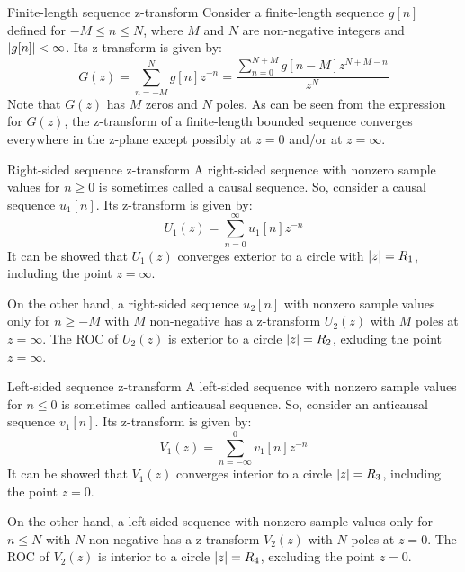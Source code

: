 \documentclass[../../main/main.tex]{subfiles}
\begin{document}
\begin{example}{Finite-length sequence z-transform}{}
    Consider a finite-length sequence \( g[n] \) defined for \( -M \le n \le N \), where \( M \) and \( N \) are non-negative integers and \( \abs{g[n]} < \infty \). Its z-transform is given by:
    \begin{equation}
        G(z)
        =
        \sum_{n=-M}^{N} g[n] z^{-n}
        =
        \frac{\displaystyle \sum_{n=0}^{N+M} g[n-M]z^{N+M-n}}{z^{N}}
        \label{eq:L14_S31_1}
    \end{equation}
    Note that \( G(z) \) has \( M \) zeros and \( N \) poles. As can be seen from the expression for \( G(z) \), the z-transform of a finite-length bounded sequence converges everywhere in the z-plane except possibly at \( z = 0 \) and/or at \( z = \infty \).
\end{example}

\begin{example}{Right-sided sequence z-transform}{}
    A right-sided sequence with nonzero sample values for \( n \ge 0 \) is sometimes called a causal sequence. So, consider a causal sequence \( u_{1}[n] \). Its z-transform is given by:
    \begin{equation}
        U_{1}(z)
        =
        \sum_{n=0}^{\infty} u_{1}[n] z^{-n}
        \label{eq:L14_S32_1}
    \end{equation}
    It can be showed that \( U_{1}(z) \) converges exterior to a circle with \( \abs{z} = R_{1} \), including the point \( z = \infty \).

    On the other hand, a right-sided sequence \( u_{2}[n] \) with nonzero sample values only for \( n \ge -M \) with \( M \) non-negative has a z-transform \( U_{2}(z) \) with \( M \) poles at \( z = \infty \).
    The ROC of \( U_{2}(z) \) is exterior to a circle \( \abs{z} = R_{2} \), exluding the point \( z = \infty \).
\end{example}

\begin{example}{Left-sided sequence z-transform}{}
    A left-sided sequence with nonzero sample values for \( n \le 0 \) is sometimes called anticausal sequence. So, consider an anticausal sequence \( v_{1}[n] \). Its z-transform is given by:
    \begin{equation}
        V_{1}(z)
        =
        \sum_{n=-\infty}^{0} v_{1}[n]z^{-n}
        \label{eq:L14_S34_1}
    \end{equation}
    It can be showed that \( V_{1}(z) \) converges interior to a circle \( \abs{z} = R_{3} \), including the point \( z = 0 \).

    On the other hand, a left-sided sequence with nonzero sample values only for \( n \le N \) with \( N \) non-negative has a z-transform \( V_{2}(z) \) with \( N \) poles at \( z = 0 \).
    The ROC of \( V_{2}(z) \) is interior to a circle \( \abs{z} = R_{4} \), excluding the point \( z = 0 \).
\end{example}
\end{document}
